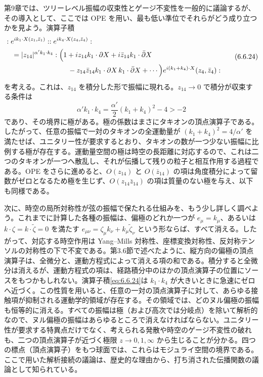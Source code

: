 
第9章では、ツリーレベル振幅の収束性とゲージ不変性を一般的に議論するが、その導入として、ここでは OPE を用い、最も低い準位でそれらがどう成り立つかを見よう。演算子積
\begin{equation}
\begin{aligned}
&:e^{ik_1\cdot X(z_1,\bar z_1)}::e^{ik_4\cdot X(z_4,\bar z_4)}:\\
&\quad=|z_{14}|^{\alpha'k_1\cdot k_4}:
\Bigl(1+iz_{14}k_1\cdot\partial X
+i\bar z_{14}k_1\cdot\bar\partial X\\
&\hspace{9em}
-z_{14}\bar z_{14}k_1\cdot\partial X\,k_1\cdot\bar\partial X+\cdots\Bigr)
e^{i(k_1+k_4)\cdot X}(z_4,\bar z_4):
\end{aligned}
\tag{6.6.24}\label{eq:6.6.24}
\end{equation}
を考える。これは、$z_{14}$ を積分した形で振幅に現れる。$z_{14}\to0$ で積分が収束する条件は
\begin{equation}
\alpha'k_1\cdot k_4
=\frac{\alpha'}2(k_1+k_4)^2-4>-2
\tag{6.6.25}\label{eq:6.6.25}
\end{equation}
であり、その境界に極がある。極の係数はまさにタキオンの頂点演算子である。したがって、任意の振幅で一対のタキオンの全運動量が $(k_1+k_4)^2=4/\alpha'$ を満たせば、ユニタリー性が要求するとおり、タキオンの数が一つ少ない振幅に比例する極が存在する。運動量空間の極は時空の長距離に対応するので、これは二つのタキオンが一つへ散乱し、それが伝播して残りの粒子と相互作用する過程である。OPE をさらに進めると、$O(z_{14})$ と $O(\bar z_{14})$ の項は角度積分によって留数がゼロとなるため極を生じず、$O(z_{14}\bar z_{14})$ の項は質量のない極を与え、以下も同様である。

次に、時空の局所対称性が弦の振幅で保たれる仕組みを、もう少し詳しく調べよう。これまでに計算した各種の振幅は、偏極のどれか一つが $e_\mu=k_\mu$、あるいは $k\cdot\zeta=k\cdot\widetilde\zeta=0$ を満たす
$e_{\mu\nu}=\zeta_\mu k_\nu+k_\mu\widetilde\zeta_\nu$
という形ならば、すべて消える。したがって、対応する時空作用は Yang--Mills 対称性、座標変換対称性、反対称テンソルの対称性の下で不変である。第3.6節で述べたように、縦方向の偏極の頂点演算子は、全微分と、運動方程式によって消える項の和である。積分すると全微分は消えるが、運動方程式の項は、経路積分中のほかの頂点演算子の位置にソースをもつかもしれない。演算子積\eqref{eq:6.6.24}は $k_1\cdot k_4$ が大きいときに急速にゼロへ近づく。この性質を用いると、任意の一対の頂点演算子に対して、あらゆる接触項が抑制される運動学的領域が存在する。その領域では、どのヌル偏極の振幅も恒等的に消える。すべての振幅は極（および高次では分岐点）を除いて解析的なので、ヌル偏極の振幅はあらゆるところで消えなければならない。ユニタリー性が要求する特異点だけでなく、考えられる発散や時空のゲージ不変性の破れも、二つの頂点演算子が近づく極限 $z\to0,1,\infty$ から生じることが分かる。四つの標点（頂点演算子）をもつ球面では、これらはモジュライ空間の境界である。ここで用いた解析接続の議論は、歴史的な理由から、打ち消された伝播関数の議論として知られている。

